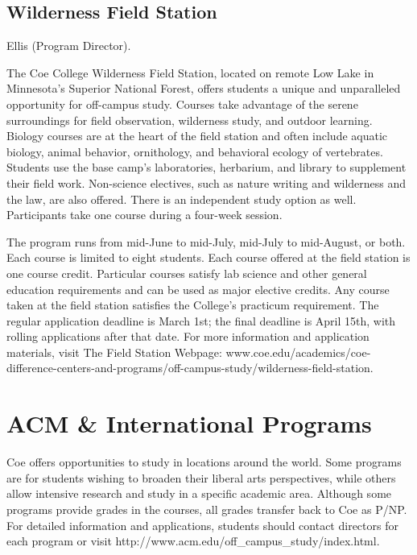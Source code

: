 \documentclass[
  letterpaper,
]{scrbook}
\begin{document}
\subsection{Wilderness Field Station}\label{wilderness-field-station}

Ellis (Program Director).

The Coe College Wilderness Field Station, located on remote Low Lake in
Minnesota's Superior National Forest, offers students a unique and
unparalleled opportunity for off-campus study. Courses take advantage of
the serene surroundings for field observation, wilderness study, and
outdoor learning. Biology courses are at the heart of the field station
and often include aquatic biology, animal behavior, ornithology, and
behavioral ecology of vertebrates. Students use the base camp's
laboratories, herbarium, and library to supplement their field work.
Non-science electives, such as nature writing and wilderness and the
law, are also offered. There is an independent study option as well.
Participants take one course during a four-week session.

The program runs from mid-June to mid-July, mid-July to mid-August, or
both. Each course is limited to eight students. Each course offered at
the field station is one course credit. Particular courses satisfy lab
science and other general education requirements and can be used as
major elective credits. Any course taken at the field station satisfies
the College's practicum requirement. The regular application deadline is
March 1st; the final deadline is April 15th, with rolling applications
after that date. For more information and application materials, visit
The Field Station Webpage:
www.coe.edu/academics/coe-difference-centers-and-programs/off-campus-study/wilderness-field-station.

\section{ACM \& International
Programs}\label{sec-ACM-and-international-programs}

Coe offers opportunities to study in locations around the world. Some
programs are for students wishing to broaden their liberal arts
perspectives, while others allow intensive research and study in a
specific academic area. Although some programs provide grades in the
courses, all grades transfer back to Coe as P/NP. For detailed
information and applications, students should contact directors for each
program or visit http://www.acm.edu/off\_campus\_study/index.html.
\end{document}
